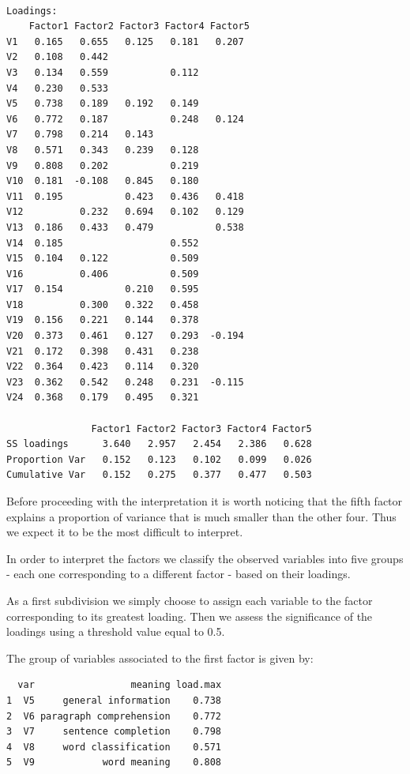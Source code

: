 \documentclass[
  letterpaper,
  DIV=11,
  numbers=noendperiod]{scrartcl}
\begin{document}
\begin{verbatim}

Loadings:
    Factor1 Factor2 Factor3 Factor4 Factor5
V1   0.165   0.655   0.125   0.181   0.207 
V2   0.108   0.442                         
V3   0.134   0.559           0.112         
V4   0.230   0.533                         
V5   0.738   0.189   0.192   0.149         
V6   0.772   0.187           0.248   0.124 
V7   0.798   0.214   0.143                 
V8   0.571   0.343   0.239   0.128         
V9   0.808   0.202           0.219         
V10  0.181  -0.108   0.845   0.180         
V11  0.195           0.423   0.436   0.418 
V12          0.232   0.694   0.102   0.129 
V13  0.186   0.433   0.479           0.538 
V14  0.185                   0.552         
V15  0.104   0.122           0.509         
V16          0.406           0.509         
V17  0.154           0.210   0.595         
V18          0.300   0.322   0.458         
V19  0.156   0.221   0.144   0.378         
V20  0.373   0.461   0.127   0.293  -0.194 
V21  0.172   0.398   0.431   0.238         
V22  0.364   0.423   0.114   0.320         
V23  0.362   0.542   0.248   0.231  -0.115 
V24  0.368   0.179   0.495   0.321         

               Factor1 Factor2 Factor3 Factor4 Factor5
SS loadings      3.640   2.957   2.454   2.386   0.628
Proportion Var   0.152   0.123   0.102   0.099   0.026
Cumulative Var   0.152   0.275   0.377   0.477   0.503
\end{verbatim}

Before proceeding with the interpretation it is worth noticing that the
fifth factor explains a proportion of variance that is much smaller than
the other four. Thus we expect it to be the most difficult to interpret.

In order to interpret the factors we classify the observed variables
into five groups - each one corresponding to a different factor - based
on their loadings.

As a first subdivision we simply choose to assign each variable to the
factor corresponding to its greatest loading. Then we assess the
significance of the loadings using a threshold value equal to 0.5.

The group of variables associated to the first factor is given by:

\begin{verbatim}
  var                 meaning load.max
1  V5     general information    0.738
2  V6 paragraph comprehension    0.772
3  V7     sentence completion    0.798
4  V8     word classification    0.571
5  V9            word meaning    0.808
\end{verbatim}
\end{document}
